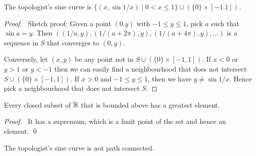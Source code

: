 \begin{proposition}
    The topologist's sine curve is $\{ (x, \sin 1/x) \mid 0 < x \leq 1 \}
    \cup (\{0\} \times [-1.1])$.
\end{proposition}

\begin{proof}
    \pf\ Sketch proof: Given a point $(0.y)$ with $-1 \leq y \leq 1$, pick $a$ such that $\sin a = y$. Then $((1/a,y), (1/(a+2\pi),y), (1/(a+4\pi),y), \ldots)$ is a sequence
    in $S$ that converges to $(0,y)$.

    Conversely, let $(x,y)$ be any point not in $S \cup (\{0\} \times [-1,1])$. If $x < 0$ or $y > 1$ or $y < -1$ then we can easily find a neighbourhood that does not intersect
    $S \cup (\{0\} \times [-1,1])$. If $x > 0$ and $-1 \leq y \leq 1$, then we have $y \neq \sin 1/x$. Hence pick a neighbourhood that does not intersect $S$.
\end{proof}

\begin{proposition}
    \label{proposition:greatest_element_closed}
    Every closed subset of $\mathbb{R}$ that is bounded above has a greatest element.
\end{proposition}

\begin{proof}
    \pf\ It has a supremum, which is a limit point of the set and hence an element. \qed
\end{proof}

\begin{proposition}[CC]
    The topologist's sine curve is not path connected.
\end{proposition}

